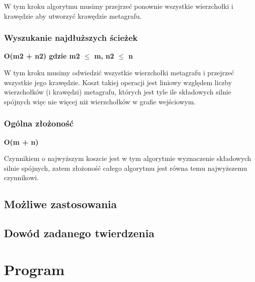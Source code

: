 \documentclass[a4paper,10pt]{article}
\begin{document}
W tym kroku algorytmu musimy przejrzeć ponownie wszystkie wierzchołki i
krawędzie aby utworzyć krawędzie metagrafu.

\subsubsection{Wyszukanie najdłuższych ścieżek}
\begin{center}
{\large\bf O(m2 + n2) gdzie m2 $\leq$ m, n2 $\leq$ n}
\end{center}

W tym kroku musimy odwiedzić wszystkie wierzchołki metagrafu i przejrzeć
wszystkie jego krawędzie. Koszt takiej operacji jest liniowy względem
liczby wierzchołków (i krawędzi) metagrafu, których jest tyle ile
składowych silnie spójnych więc nie więcej niż wierzchołków w grafie
wejściowym.

\subsubsection{Ogólna złożoność}
\begin{center}
{\large\bf O(m + n)}
\end{center}

Czynnikiem o najwyższym koszcie jest w tym algorytmie wyznaczenie
składowych silnie spójnych, zatem złożoność całego algorytmu jest
równa temu najwyższemu czynnikowi.

\subsection{Możliwe zastosowania}
\subsection{Dowód zadanego twierdzenia}
\section{Program}
\end{document}
